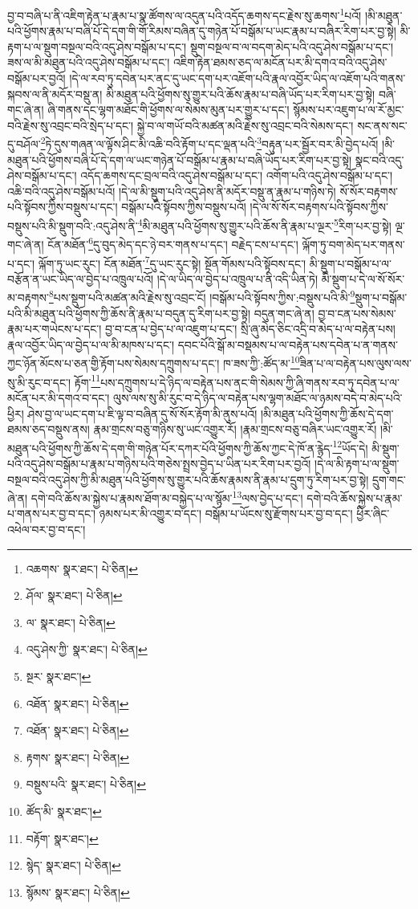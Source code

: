 བྱ་བ་བཞི་པ་ནི་འཇིག་རྟེན་པ་རྣམ་པ་སྣ་ཚོགས་ལ་འདུན་པའི་འདོད་ཆགས་དང་རྗེས་སུ་ཆགས་\footnote{འཆགས་  སྣར་ཐང་།  པེ་ཅིན། }པའོ། །མི་མཐུན་པའི་ཕྱོགས་རྣམ་པ་བཞི་པོ་དེ་དག་གི་གོ་རིམས་བཞིན་དུ་གཉེན་པོ་བསྒོམ་པ་ཡང་རྣམ་པ་བཞིར་རིག་པར་བྱ་སྟེ། མི་རྟག་པ་ལ་སྡུག་བསྔལ་བའི་འདུ་ཤེས་བསྒོམ་པ་དང་། སྡུག་བསྔལ་བ་ལ་བདག་མེད་པའི་འདུ་ཤེས་བསྒོམ་པ་དང་། ཟས་ལ་མི་མཐུན་པའི་འདུ་ཤེས་བསྒོམ་པ་དང་། འཇིག་རྟེན་ཐམས་ཅད་ལ་མངོན་པར་མི་དགའ་བའི་འདུ་ཤེས་བསྒོམ་པར་བྱའོ། །དེ་ལ་རབ་ཏུ་དབེན་པར་ནང་དུ་ཡང་དག་པར་འཇོག་པའི་རྣལ་འབྱོར་ཡིད་ལ་འཇོག་པའི་གནས་སྐབས་ལ་ནི་མདོར་བསྡུ་ན། མི་མཐུན་པའི་ཕྱོགས་སུ་གྱུར་པའི་ཆོས་རྣམ་པ་བཞི་ཡོད་པར་རིག་པར་བྱ་སྟེ། བཞི་གང་ཞེ་ན། ཞི་གནས་དང་ལྷག་མཐོང་གི་ཕྱོགས་ལ་སེམས་མུན་པར་གྱུར་པ་དང་། སྙོམས་པར་འཇུག་པ་ལ་རོ་མྱང་བའི་རྗེས་སུ་འབྲང་བའི་སྲེད་པ་དང་། སྐྱེ་བ་ལ་གཡོ་བའི་མཚན་མའི་རྗེས་སུ་འབྲང་བའི་སེམས་དང་། སང་ནས་སང་དུ་བཤོལ་\footnote{ཤོལ་  སྣར་ཐང་།  པེ་ཅིན། }ཏེ་དུས་གཞན་ལ་ལྟོས་ཤིང་མི་འཆི་བའི་རྟོག་པ་དང་ལྡན་པའི་\footnote{ལ་  སྣར་ཐང་།  པེ་ཅིན། }བརྟུན་པར་སྦྱོར་བར་མི་བྱེད་པའོ། །མི་མཐུན་པའི་ཕྱོགས་བཞི་པོ་དེ་དག་ལ་ཡང་གཉེན་པོ་བསྒོམ་པ་རྣམ་པ་བཞི་ཡོད་པར་རིག་པར་བྱ་སྟེ། སྣང་བའི་འདུ་ཤེས་བསྒོམ་པ་དང་། འདོད་ཆགས་དང་བྲལ་བའི་འདུ་ཤེས་བསྒོམ་པ་དང་། འགོག་པའི་འདུ་ཤེས་བསྒོམ་པ་དང་། འཆི་བའི་འདུ་ཤེས་བསྒོམ་པའོ། །དེ་ལ་མི་སྡུག་པའི་འདུ་ཤེས་ནི་མདོར་བསྡུ་ན་རྣམ་པ་གཉིས་ཏེ། སོ་སོར་བརྟགས་པའི་སྟོབས་ཀྱིས་བསྡུས་པ་དང་། བསྒོམ་པའི་སྟོབས་ཀྱིས་བསྡུས་པའོ། །དེ་ལ་སོ་སོར་བརྟགས་པའི་སྟོབས་ཀྱིས་བསྡུས་པའི་མི་སྡུག་བའི་:འདུ་ཤེས་ནི་\footnote{འདུ་ཤེས་ཀྱི་  སྣར་ཐང་།  པེ་ཅིན། }མི་མཐུན་པའི་ཕྱོགས་སུ་གྱུར་པའི་ཆོས་ནི་རྣམ་པ་ལྔར་\footnote{སྔར་  སྣར་ཐང་། }རིག་པར་བྱ་སྟེ། ལྔ་གང་ཞེ་ན། ངོན་མཐོན་\footnote{འཐོན་  སྣར་ཐང་།  པེ་ཅིན། }དུ་བུད་མེད་དང་ཉེ་བར་གནས་པ་དང་། བརྗེད་ངས་པ་དང་། ལྐོག་ཏུ་བག་མེད་པར་གནས་པ་དང་། ལྐོག་ཏུ་ཡང་རུང་། ངོན་མཐོན་\footnote{འཐོན་  སྣར་ཐང་།  པེ་ཅིན། }དུ་ཡང་རུང་སྟེ། སྔོན་གོམས་པའི་སྟོབས་དང་། མི་སྡུག་པ་བསྒོམ་པ་ལ་བརྩོན་ན་ཡང་ཡིད་ལ་བྱེད་པ་འཁྲུལ་པའོ། །དེ་ལ་ཡིད་ལ་བྱེད་པ་འཁྲུལ་པ་ནི་འདི་ཡིན་ཏེ། མི་སྡུག་པ་དེ་ལ་སོ་སོར་མ་བརྟགས་\footnote{རྟགས་  སྣར་ཐང་།  པེ་ཅིན། }པས་སྡུག་པའི་མཚན་མའི་རྗེས་སུ་འབྲང་ངོ། །བསྒོམ་པའི་སྟོབས་ཀྱིས་:བསྡུས་པའི་མི་\footnote{བསྡུས་པའི་  སྣར་ཐང་།  པེ་ཅིན། }སྡུག་པ་བསྒོམ་པའི་མི་མཐུན་པའི་ཕྱོགས་ཀྱི་ཆོས་ནི་རྣམ་པ་བདུན་དུ་རིག་པར་བྱ་སྟེ། བདུན་གང་ཞེ་ན། བྱ་བ་ངན་པས་སེམས་རྣམ་པར་གཡེངས་པ་དང་། བྱ་བ་ངན་པ་བྱེད་པ་ལ་འཇུག་པ་དང་། སྲི་ཞུ་མེད་ཅིང་འདྲི་བ་མེད་པ་ལ་བརྟེན་པས། རྣལ་འབྱོར་ཡིད་ལ་བྱེད་པ་ལ་མི་མཁས་པ་དང་། དབང་པོའི་སྒོ་མ་བསྡམས་པ་ལ་བརྟེན་པས་དབེན་པ་ན་གནས་ཀྱང་ཉོན་མོངས་པ་ཅན་གྱི་རྟོག་པས་སེམས་དཀྲུགས་པ་དང་། ཁ་ཟས་ཀྱི་:ཚོད་མ་\footnote{ཚོད་མི་  སྣར་ཐང་། }ཟིན་པ་ལ་བརྟེན་པས་ལུས་ལས་སུ་མི་རུང་བ་དང་། རྟོག་\footnote{བརྟོག་  སྣར་ཐང་། }པས་དཀྲུགས་པ་དེ་ཉིད་ལ་བརྟེན་པས་ནང་གི་སེམས་ཀྱི་ཞི་གནས་རབ་ཏུ་དབེན་པ་ལ་མངོན་པར་མི་དགའ་བ་དང་། ལུས་ལས་སུ་མི་རུང་བ་དེ་ཉིད་ལ་བརྟེན་པས་ལྷག་མཐོང་ལ་ཉམས་བདེ་བ་མེད་པའི་ཕྱིར། ཤེས་བྱ་ལ་ཡང་དག་པ་ཇི་ལྟ་བ་བཞིན་དུ་སོ་སོར་རྟོག་མི་ནུས་པའོ། །མི་མཐུན་པའི་ཕྱོགས་ཀྱི་ཆོས་དེ་དག་ཐམས་ཅད་བསྡུས་ནས། རྣམ་གྲངས་བཅུ་གཉིས་སུ་ཡང་འགྱུར་རོ། །རྣམ་གྲངས་བཅུ་བཞིར་ཡང་འགྱུར་རོ། །མི་མཐུན་པའི་ཕྱོགས་ཀྱི་ཆོས་དེ་དག་གི་གཉེན་པོར་དཀར་པོའི་ཕྱོགས་ཀྱི་ཆོས་ཀྱང་དེ་ཁོ་ན་རྙེད་\footnote{སྙེད་  སྣར་ཐང་།  པེ་ཅིན། }ཡོད་དེ། མི་སྡུག་པའི་འདུ་ཤེས་བསྒོམ་པ་རྣམ་པ་གཉིས་པའི་གཅེས་སྤྲས་བྱེད་པ་ཡིན་པར་རིག་པར་བྱའོ། །དེ་ལ་མི་རྟག་པ་ལ་སྡུག་བསྔལ་བའི་འདུ་ཤེས་ཀྱི་མི་མཐུན་པའི་ཕྱོགས་སུ་གྱུར་པའི་ཆོས་རྣམས་ནི་རྣམ་པ་དྲུག་ཏུ་རིག་པར་བྱ་སྟེ། དྲུག་གང་ཞེ་ན། དགེ་བའི་ཆོས་མ་སྐྱེས་པ་རྣམས་ཐོག་མ་བསྐྱེད་པ་ལ་སྙོམ་\footnote{སྙོམས་  སྣར་ཐང་།  པེ་ཅིན། }ལས་བྱེད་པ་དང་། དགེ་བའི་ཆོས་སྐྱེས་པ་རྣམ་པ་གནས་པར་བྱ་བ་དང་། ཉམས་པར་མི་འགྱུར་བ་དང་། བསྒོམ་པ་ཡོངས་སུ་རྫོགས་པར་བྱ་བ་དང་། ཕྱིར་ཞིང་འཕེལ་བར་བྱ་བ་དང་། 
